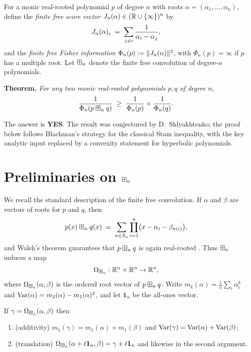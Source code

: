 \documentclass[11pt]{article}
\begin{document}
For a monic real-rooted polynomial $p$ of degree $n$ with roots
$\alpha=(\alpha_1,\dots,\alpha_n)$, define the \emph{finite free score vector}
$J_n(\alpha)\in(\mathbb{R}\cup\{\infty\})^n$ by
\[
J_n(\alpha)_i \;=\; \sum_{j\ne i}\frac{1}{\alpha_i-\alpha_j},
\]
and the \emph{finite free Fisher information}
$\Phi_n(p):=\|J_n(\alpha)\|^2$, with $\Phi_n(p)=\infty$ if $p$ has a
multiple root. Let $\boxplus_n$ denote the finite free convolution of degree-$n$
polynomials.

\medskip
\noindent\textbf{Theorem.} \emph{For any two monic real-rooted polynomials
$p,q$ of degree $n$,}
\[
\frac{1}{\Phi_n(p\boxplus_n q)}\;\ge\;\frac{1}{\Phi_n(p)}+\frac{1}{\Phi_n(q)}.
\]

\medskip
\noindent The answer is \textbf{YES}. The result was conjectured by
D.~Shlyakhtenko; the proof below follows Blachman's strategy for the classical
Stam inequality, with the key analytic input replaced by a convexity statement
for hyperbolic polynomials.

\section*{Preliminaries on $\boxplus_n$}

We recall the standard description of the finite free convolution. If $\alpha$
and $\beta$ are vectors of roots for $p$ and $q$, then
\begin{equation}\label{eq:walsh}
p(x)\boxplus_n q(x)\;=\;\sum_{\pi\in S_n}\prod_{i=1}^n\bigl(x-\alpha_i-\beta_{\pi(i)}\bigr),
\end{equation}
and Walsh's theorem guarantees that $p\boxplus_n q$ is again real-rooted
\cite{Walsh, MSS22}. Thus $\boxplus_n$ induces a map
\[
\Omega_{\boxplus_n}:\mathbb{R}^n\times\mathbb{R}^n\to\mathbb{R}^n,
\]
where $\Omega_{\boxplus_n}(\alpha,\beta)$ is the ordered root vector of $p\boxplus_n q$. Write
$m_k(\alpha)=\frac1n\sum_i\alpha_i^k$ and
$\operatorname{Var}(\alpha)=m_2(\alpha)-m_1(\alpha)^2$, and let $\mathbf 1_n$ be the all-ones
vector.

\begin{qfourproposition}\label{prop:props}
If $\gamma=\Omega_{\boxplus_n}(\alpha,\beta)$ then
\begin{enumerate}\setlength\itemsep{2pt}
\item (additivity) $m_1(\gamma)=m_1(\alpha)+m_1(\beta)$ and
$\operatorname{Var}(\gamma)=\operatorname{Var}(\alpha)+\operatorname{Var}(\beta)$;
\item (translation) $\Omega_{\boxplus_n}(\alpha+t\mathbf 1_n,\beta)=\gamma+t\mathbf 1_n$
and likewise in the second argument.
\end{enumerate}
\end{qfourproposition}
\end{document}
